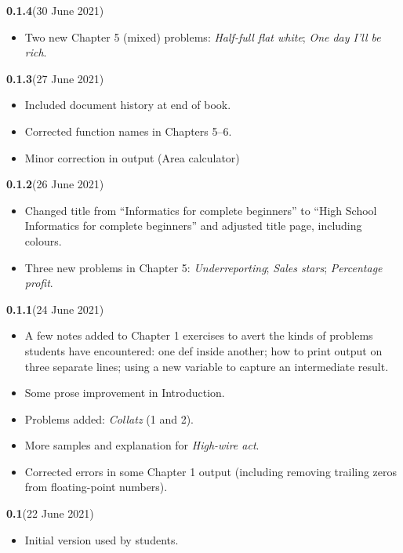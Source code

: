 

{
\small

\newcommand{\versionmarker}[2]{\textbf{#1}\quad(#2)}

\versionmarker{0.1.4}{30 June 2021}
\begin{itemize}
  \item Two new Chapter 5 (mixed) problems: \emph{Half-full flat white};
    \emph{One day I'll be rich}.
\end{itemize}

\versionmarker{0.1.3}{27 June 2021}
\begin{itemize}
  \item Included document history at end of book.
  \item Corrected function names in Chapters 5--6.
  \item Minor correction in output (Area calculator)
\end{itemize}

\versionmarker{0.1.2}{26 June 2021}
\begin{itemize}
  \item Changed title from ``Informatics for complete beginners'' to ``High School
    Informatics for complete beginners'' and adjusted title page, including colours.
  \item Three new problems in Chapter 5: \emph{Underreporting}; \emph{Sales stars};
    \emph{Percentage profit}.
\end{itemize}

\versionmarker{0.1.1}{24 June 2021}
\begin{itemize}
  \item A few notes added to Chapter 1 exercises to avert the kinds of problems students
    have encountered: one def inside another; how to print output on three separate lines;
    using a new variable to capture an intermediate result.
  \item Some prose improvement in Introduction.
  \item Problems added: \emph{Collatz} (1 and 2).
  \item More samples and explanation for \emph{High-wire act}.
  \item Corrected errors in some Chapter 1 output (including removing trailing zeros from
    floating-point numbers).
\end{itemize}

\versionmarker{0.1}{22 June 2021}
\begin{itemize}
  \item Initial version used by students.
\end{itemize}

}

